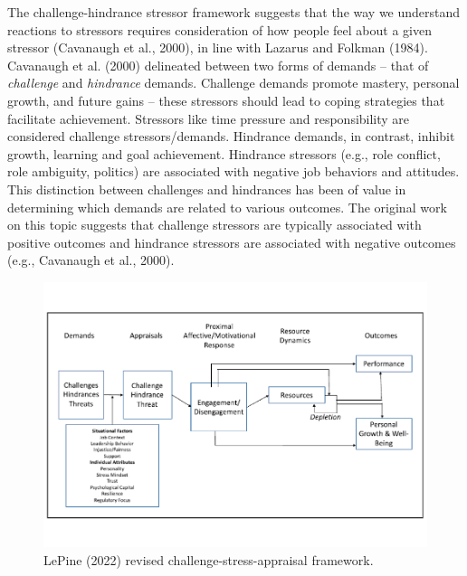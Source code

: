 \documentclass[
  man,mask]{apa6}
\begin{document}
The challenge-hindrance stressor framework suggests that the way we understand reactions to stressors requires consideration of how people feel about a given stressor (Cavanaugh et al., 2000), in line with Lazarus and Folkman (1984). Cavanaugh et al. (2000) delineated between two forms of demands -- that of \emph{challenge} and \emph{hindrance} demands. Challenge demands promote mastery, personal growth, and future gains -- these stressors should lead to coping strategies that facilitate achievement. Stressors like time pressure and responsibility are considered challenge stressors/demands. Hindrance demands, in contrast, inhibit growth, learning and goal achievement. Hindrance stressors (e.g., role conflict, role ambiguity, politics) are associated with negative job behaviors and attitudes. This distinction between challenges and hindrances has been of value in determining which demands are related to various outcomes. The original work on this topic suggests that challenge stressors are typically associated with positive outcomes and hindrance stressors are associated with negative outcomes (e.g., Cavanaugh et al., 2000).

\begin{figure}
\centering
\includegraphics{Submission_files/figure-latex/reproduced-1.pdf}
\caption{\label{fig:reproduced}LePine (2022) revised challenge-stress-appraisal framework.}
\end{figure}
\end{document}

